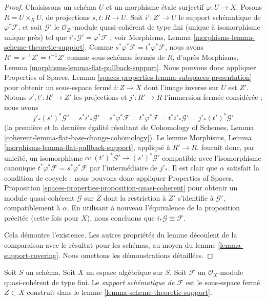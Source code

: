 \begin{proof}
Choisissons un schéma $U$ et un morphisme étale surjectif $\varphi : U \to X$.
Posons $R = U \times_X U$, de projections $s, t : R \to U$.
Soit $i' : Z' \to U$ le support schématique de $\varphi^*\mathcal{F}$,
et soit $\mathcal{G}'$ le $\mathcal{O}_{Z'}$-module quasi-cohérent de type fini
(unique à isomorphisme unique près)
tel que $i'_*\mathcal{G}' = \varphi^*\mathcal{F}$ ; voir
Morphisms, Lemma \ref{morphisms-lemma-scheme-theoretic-support}.
Comme $s^*\varphi^*\mathcal{F} = t^*\varphi^*\mathcal{F}$, nous avons
$R' = s^{-1}Z' = t^{-1}Z'$ comme sous-schémas fermés de $R$, d'après
Morphisms, Lemma \ref{morphisms-lemma-flat-pullback-support}.
Nous pouvons donc appliquer Properties of Spaces, Lemma
\ref{spaces-properties-lemma-subspaces-presentation}
pour obtenir un sous-espace fermé $i : Z \to X$ dont l'image inverse sur $U$ est $Z'$.
Notons $s', t' : R' \to Z'$ les projections et
$j' : R' \to R$ l'immersion fermée considérée ; nous avons
$$
j'_* (s')^*\mathcal{G}' = s^* i'_*\mathcal{G}' =
s^*\varphi^*\mathcal{F} = t^*\varphi^*\mathcal{F} =
t^*i'_*\mathcal{G}' = j'_*(t')^*\mathcal{G}'
$$
(la première et la dernière égalité résultant de Cohomology of Schemes,
Lemma \ref{coherent-lemma-flat-base-change-cohomology}).
Le lemme
Morphisms, Lemma \ref{morphisms-lemma-flat-pullback-support},
appliqué à $R' \to R$, fournit donc, par unicité, un isomorphisme
$\alpha : (t')^*\mathcal{G}' \to (s')^*\mathcal{G}'$
compatible avec l'isomorphisme canonique
$t^*\varphi^*\mathcal{F} = s^*\varphi^*\mathcal{F}$
par l'intermédiaire de $j'_*$. Il est clair que $\alpha$ satisfait la condition de cocycle ;
nous pouvons donc appliquer
Properties of Spaces, Proposition
\ref{spaces-properties-proposition-quasi-coherent}
pour obtenir un module quasi-cohérent $\mathcal{G}$ sur $Z$ dont la restriction
à $Z'$ s'identifie à $\mathcal{G}'$, compatiblement à $\alpha$.
En utilisant à nouveau l'équivalence de la proposition précitée
(cette fois pour $X$), nous concluons que $i_*\mathcal{G} \cong \mathcal{F}$.

\medskip\noindent
Cela démontre l'existence. Les autres propriétés du lemme découlent
de la comparaison avec le résultat pour les schémas, au moyen du
lemme \ref{lemma-support-covering}.
Nous omettons les démonstrations détaillées.
\end{proof}

\begin{definition}
\label{definition-scheme-theoretic-support}
Soit $S$ un schéma. Soit $X$ un espace algébrique sur $S$.
Soit $\mathcal{F}$ un $\mathcal{O}_X$-module quasi-cohérent de type fini.
Le {\it support schématique de $\mathcal{F}$} est le sous-espace fermé
$Z \subset X$ construit dans le lemme \ref{lemma-scheme-theoretic-support}.
\end{definition}

